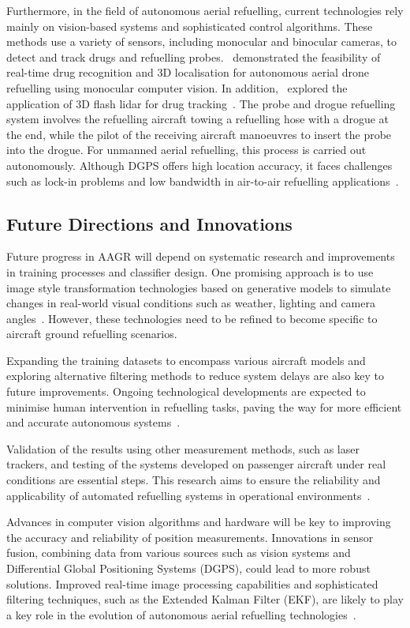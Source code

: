 \documentclass[12pt,oneside]{book} %
\begin{document}
Furthermore, in the field of autonomous aerial refuelling, current technologies
rely mainly on vision-based systems and sophisticated control algorithms. These
methods use a variety of sensors, including monocular and binocular cameras, to
detect and track drugs and refuelling probes.~\citet{AARCNN} demonstrated the
feasibility of real-time drug recognition and 3D localisation for autonomous
aerial drone refuelling using monocular computer vision. In
addition,~\citet{Chen2011} explored the application of 3D flash lidar for drug
tracking~\cite{AARCNN}. The probe and drogue refuelling system involves the
refuelling aircraft towing a refuelling hose with a drogue at the end, while
the pilot of the receiving aircraft manoeuvres to insert the probe into the
drogue. For unmanned aerial refuelling, this process is carried out
autonomously. Although DGPS offers high location accuracy, it faces challenges
such as lock-in problems and low bandwidth in air-to-air refuelling
applications~\cite{AAREKF}.

\subsection{Future Directions and Innovations}
Future progress in AAGR will depend on systematic research and improvements in
training processes and classifier design. One promising approach is to use
image style transformation technologies based on generative models to simulate
changes in real-world visual conditions such as weather, lighting and camera
angles~\cite{DatasetAGR}. However, these technologies need to be refined to
become specific to aircraft ground refuelling scenarios.

Expanding the training datasets to encompass various aircraft models and
exploring alternative filtering methods to reduce system delays are also key to
future improvements. Ongoing technological developments are expected to
minimise human intervention in refuelling tasks, paving the way for more
efficient and accurate autonomous systems~\cite{AGRPoseEstimation}.

Validation of the results using other measurement methods, such as laser
trackers, and testing of the systems developed on passenger aircraft under real
conditions are essential steps. This research aims to ensure the reliability
and applicability of automated refuelling systems in operational
environments~\cite{HybridDatasetAGRV1}.

Advances in computer vision algorithms and hardware will be key to improving
the accuracy and reliability of position measurements. Innovations in sensor
fusion, combining data from various sources such as vision systems and
Differential Global Positioning Systems (DGPS), could lead to more robust
solutions. Improved real-time image processing capabilities and sophisticated
filtering techniques, such as the Extended Kalman Filter (EKF), are likely to
play a key role in the evolution of autonomous aerial refuelling
technologies~\cite{AAREKF}.
\end{document}
